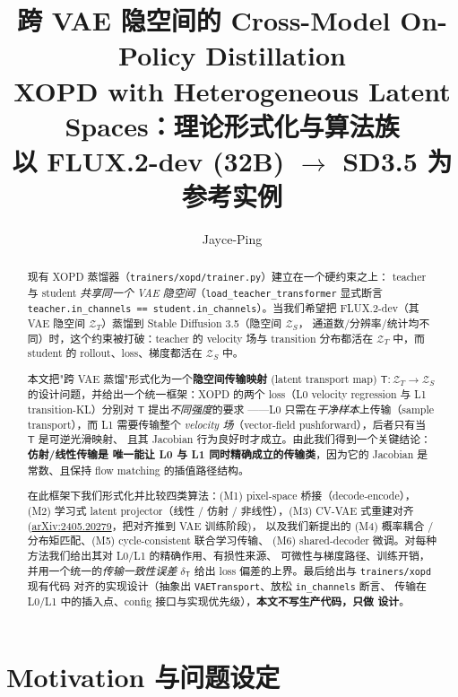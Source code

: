 \documentclass[11pt,a4paper]{article}
\title{\textbf{跨 VAE 隐空间的 Cross-Model On-Policy Distillation}\\[0.3em]
\large XOPD with Heterogeneous Latent Spaces：理论形式化与算法族\\[0.4em]
\large 以 FLUX.2-dev (32B) $\to$ SD3.5 为参考实例}
\author{Jayce-Ping}
\date{}
\newcommand{\Zt}{\mathcal{Z}_T}
\newcommand{\Zs}{\mathcal{Z}_S}
\newcommand{\Tmap}{\mathsf{T}}
\theoremstyle{definition}
\begin{document}
\maketitle

\begin{abstract}
现有 XOPD 蒸馏器（\texttt{trainers/xopd/trainer.py}）建立在一个硬约束之上：
teacher 与 student \emph{共享同一个 VAE 隐空间}（\texttt{load\_teacher\_transformer}
显式断言 \texttt{teacher.in\_channels == student.in\_channels}）。当我们希望把
FLUX.2-dev（其 VAE 隐空间 $\Zt$）蒸馏到 Stable Diffusion 3.5（隐空间 $\Zs$，
通道数/分辨率/统计均不同）时，这个约束被打破：teacher 的 velocity 场与 transition
分布都活在 $\Zt$ 中，而 student 的 rollout、loss、梯度都活在 $\Zs$ 中。

本文把"跨 VAE 蒸馏"形式化为一个\textbf{隐空间传输映射} (latent transport map)
$\Tmap:\Zt\to\Zs$ 的设计问题，并给出一个统一框架：XOPD 的两个 loss（L0
velocity regression 与 L1 transition-KL）分别对 $\Tmap$ 提出\emph{不同强度}的要求
——L0 只需在\emph{干净样本}上传输（sample transport），而 L1 需要传输整个
\emph{velocity 场}（vector-field pushforward），后者只有当 $\Tmap$ 是可逆光滑映射、
且其 Jacobian 行为良好时才成立。由此我们得到一个关键结论：\textbf{仿射/线性传输是
唯一能让 L0 与 L1 同时精确成立的传输类}，因为它的 Jacobian 是常数、且保持 flow
matching 的插值路径结构。

在此框架下我们形式化并比较四类算法：(M1) pixel-space 桥接（decode-encode），
(M2) 学习式 latent projector（线性 / 仿射 / 非线性），(M3) CV-VAE 式重建对齐
(\href{https://arxiv.org/abs/2405.20279}{arXiv:2405.20279}，把对齐推到 VAE 训练阶段)，
以及我们新提出的 (M4) 概率耦合 / 分布矩匹配、(M5) cycle-consistent 联合学习传输、
(M6) shared-decoder 微调。对每种方法我们给出其对 L0/L1 的精确作用、有损性来源、
可微性与梯度路径、训练开销，并用一个统一的\emph{传输一致性误差}
$\delta_{\Tmap}$ 给出 loss 偏差的上界。最后给出与 \texttt{trainers/xopd} 现有代码
对齐的实现设计（抽象出 \texttt{VAETransport}、放松 \texttt{in\_channels} 断言、
传输在 L0/L1 中的插入点、config 接口与实现优先级），\textbf{本文不写生产代码，只做
设计}。
\end{abstract}

\tableofcontents
\newpage

\section{Motivation 与问题设定}
\label{sec:motivation}
\end{document}
